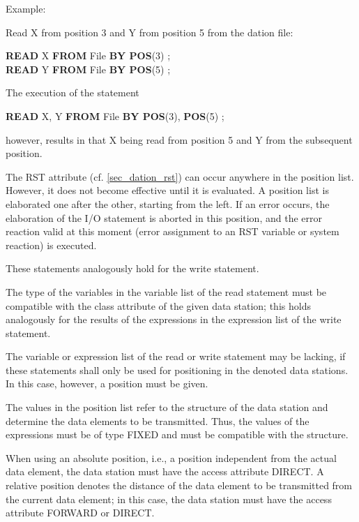 Example:

Read X from position 3 and Y from position 5 from the dation file:

{\bf READ} X {\bf FROM} File {\bf BY POS}(3) ;\\
{\bf READ} Y {\bf FROM} File {\bf BY POS}(5) ;

The execution of the statement

{\bf READ} X, Y {\bf FROM} File {\bf BY POS}(3), {\bf POS}(5) ;

however, results in that X being read from position 5 and Y from the
subsequent position.

The RST attribute (cf. \ref{sec_dation_rst}) can occur anywhere in the
 position list.
However, it does not become effective until it is evaluated. A position
list is elaborated one after the other, starting from the left. If an
error occurs, the elaboration of the I/O statement is aborted in this
position, and the error reaction valid at this moment (error assignment
to an RST variable or system reaction) is executed.

These statements analogously hold for the write statement.

The type of the variables in the variable list of the read statement
must be compatible with the class attribute of the given data station;
this holds analogously for the results of the expressions in the
expression list of the write statement.

The variable or expression list of the read or write statement may be
lacking, if these statements shall only be used for positioning in the
denoted data stations. In this case, however, a position must be
given.

The values in the position list refer to the structure of the data
station and determine the data elements to be transmitted. Thus, the
values of the expressions must be of type FIXED and must be compatible
with the structure.

When using an absolute position, i.e., a position independent from the
actual data element, the data station must have the access attribute
DIRECT. A relative position denotes the distance of the data element to
be transmitted from the current data element; in this case, the data
station must have the access attribute FORWARD
 or DIRECT.

